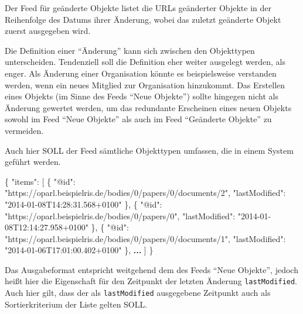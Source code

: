 \documentclass[,a4paper]{article}
\newenvironment{Shaded}{}{}
\newcommand{\DataTypeTok}[1]{\textcolor[rgb]{0.56,0.13,0.00}{{#1}}}
\newcommand{\StringTok}[1]{\textcolor[rgb]{0.25,0.44,0.63}{{#1}}}
\newcommand{\ErrorTok}[1]{\textcolor[rgb]{1.00,0.00,0.00}{\textbf{{#1}}}}
\newcommand{\NormalTok}[1]{{#1}}
\begin{document}

Der Feed für geänderte Objekte listet die URLs geänderter Objekte in der
Reihenfolge des Datums ihrer Änderung, wobei das zuletzt geänderte
Objekt zuerst ausgegeben wird.

Die Definition einer ``Änderung'' kann sich zwischen den Objekttypen
unterscheiden. Tendenziell soll die Definition eher weiter ausgelegt
werden, als enger. Als Änderung einer Organisation könnte es
beispielsweise verstanden werden, wenn ein neues Mitglied zur
Organisation hinzukommt. Das Erstellen eines Objekts (im Sinne des Feeds
``Neue Objekte'') sollte hingegen nicht als Änderung gewertet werden, um
das redundante Erscheinen eines neuen Objekts sowohl im Feed ``Neue
Objekte'' als auch im Feed ``Geänderte Objekte'' zu vermeiden.

Auch hier SOLL der Feed sämtliche Objekttypen umfassen, die in einem
System geführt werden.

\begin{Shaded}
\begin{Highlighting}[]
\NormalTok{\{}
    \DataTypeTok{"items"}\NormalTok{: [}
        \NormalTok{\{}
            \DataTypeTok{"@id"}\NormalTok{: }\StringTok{"https://oparl.beispielris.de/bodies/0/papers/0/documents/2"}\NormalTok{,}
            \DataTypeTok{"lastModified"}\NormalTok{: }\StringTok{"2014-01-08T14:28:31.568+0100"}
        \NormalTok{\},}
        \NormalTok{\{}
            \DataTypeTok{"@id"}\NormalTok{: }\StringTok{"https://oparl.beispielris.de/bodies/0/papers/0"}\NormalTok{,}
            \DataTypeTok{"lastModified"}\NormalTok{: }\StringTok{"2014-01-08T12:14:27.958+0100"}
        \NormalTok{\},}
        \NormalTok{\{}
            \DataTypeTok{"@id"}\NormalTok{: }\StringTok{"https://oparl.beispielris.de/bodies/0/papers/0/documents/1"}\NormalTok{,}
            \DataTypeTok{"lastModified"}\NormalTok{: }\StringTok{"2014-01-06T17:01:00.402+0100"}
        \NormalTok{\},}
        \ErrorTok{...}
    \NormalTok{]}
\NormalTok{\}}
\end{Highlighting}
\end{Shaded}

Das Ausgabeformat entspricht weitgehend dem des Feeds ``Neue Objekte'',
jedoch heißt hier die Eigenschaft für den Zeitpunkt der letzten Änderung
\texttt{lastModified}. Auch hier gilt, dass der als
\texttt{lastModified} ausgegebene Zeitpunkt auch als Sortierkriterium
der Liste gelten SOLL.
\end{document}
